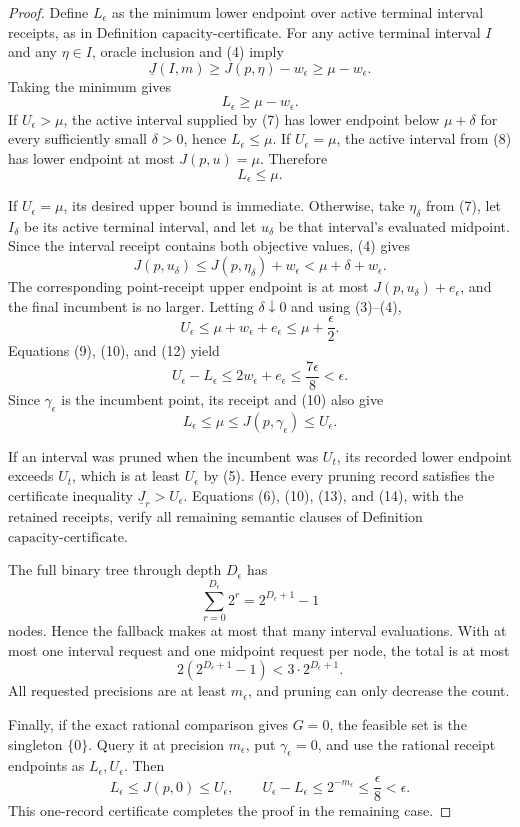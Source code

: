 \documentclass{article}
\begin{document}
\begin{proof}
Define \(L_\epsilon\) as the minimum lower endpoint over active terminal interval receipts, as in Definition \(\mathrm{capacity\mbox{-}certificate}\).  For any active terminal interval \(I\) and any \(\eta\in I\), oracle inclusion and (4) imply
\[
 \underline J(I,m)\geq J(p,\eta)-w_\epsilon\geq\mu-w_\epsilon.
\]
Taking the minimum gives
\[
 L_\epsilon\geq\mu-w_\epsilon.
\tag{9}
\]
If \(U_\epsilon>\mu\), the active interval supplied by (7) has lower endpoint below \(\mu+\delta\) for every sufficiently small \(\delta>0\), hence \(L_\epsilon\leq\mu\).  If \(U_\epsilon=\mu\), the active interval from (8) has lower endpoint at most \(J(p,u)=\mu\).  Therefore
\[
 L_\epsilon\leq\mu.
\tag{10}
\]

If \(U_\epsilon=\mu\), its desired upper bound is immediate.  Otherwise, take \(\eta_\delta\) from (7), let \(I_\delta\) be its active terminal interval, and let \(u_\delta\) be that interval's evaluated midpoint.  Since the interval receipt contains both objective values, (4) gives
\[
 J(p,u_\delta)\leq J(p,\eta_\delta)+w_\epsilon
 <\mu+\delta+w_\epsilon.
\tag{11}
\]
The corresponding point-receipt upper endpoint is at most \(J(p,u_\delta)+e_\epsilon\), and the final incumbent is no larger.  Letting \(\delta\downarrow0\) and using (3)--(4),
\[
 U_\epsilon\leq\mu+w_\epsilon+e_\epsilon
 \leq\mu+\frac\epsilon2.
\tag{12}
\]
Equations (9), (10), and (12) yield
\[
 U_\epsilon-L_\epsilon
 \leq2w_\epsilon+e_\epsilon
 \leq\frac{7\epsilon}{8}<\epsilon.
\tag{13}
\]
Since \(\gamma_\epsilon\) is the incumbent point, its receipt and (10) also give
\[
 L_\epsilon\leq\mu
 \leq J(p,\gamma_\epsilon)\leq U_\epsilon.
\tag{14}
\]

If an interval was pruned when the incumbent was \(U_t\), its recorded lower endpoint exceeds \(U_t\), which is at least \(U_\epsilon\) by (5).  Hence every pruning record satisfies the certificate inequality \(\underline J_r>U_\epsilon\).  Equations (6), (10), (13), and (14), with the retained receipts, verify all remaining semantic clauses of Definition \(\mathrm{capacity\mbox{-}certificate}\).

The full binary tree through depth \(D_\epsilon\) has
\[
 \sum_{r=0}^{D_\epsilon}2^r=2^{D_\epsilon+1}-1
\tag{15}
\]
nodes.  Hence the fallback makes at most that many interval evaluations.  With at most one interval request and one midpoint request per node, the total is at most
\[
 2(2^{D_\epsilon+1}-1)<3\cdot2^{D_\epsilon+1}.
\tag{16}
\]
All requested precisions are at least \(m_\epsilon\), and pruning can only decrease the count.

Finally, if the exact rational comparison gives \(G=0\), the feasible set is the singleton \(\{0\}\).  Query it at precision \(m_\epsilon\), put \(\gamma_\epsilon=0\), and use the rational receipt endpoints as \(L_\epsilon,U_\epsilon\).  Then
\[
 L_\epsilon\leq J(p,0)\leq U_\epsilon,
 \qquad U_\epsilon-L_\epsilon\leq2^{-m_\epsilon}
 \leq\frac\epsilon8<\epsilon.
\]
This one-record certificate completes the proof in the remaining case.
\end{proof}
\end{document}
